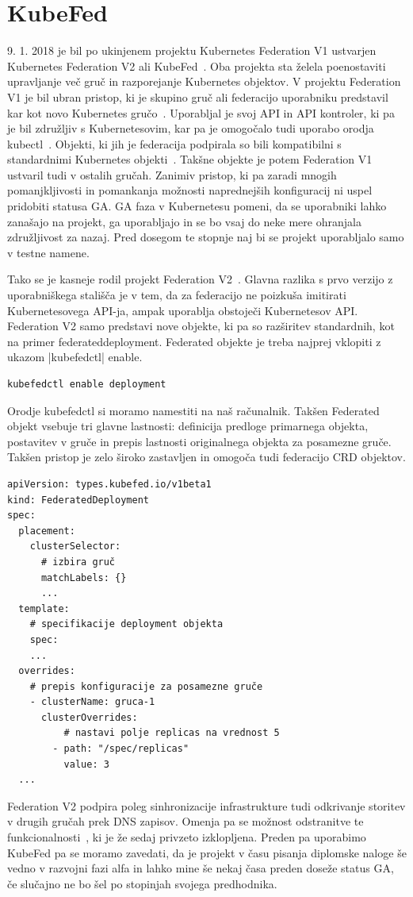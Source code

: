 \documentclass[a4paper, 12pt]{book}
\begin{document}
\section{KubeFed}
9. 1. 2018 je bil po ukinjenem projektu Kubernetes Federation V1 ustvarjen Kubernetes Federation V2 ali KubeFed~\cite{kubernetes-federation-evolution}.
Oba projekta sta želela poenostaviti upravljanje več gruč in razporejanje Kubernetes objektov.
V projektu Federation V1 je bil ubran pristop, ki je skupino gruč ali federacijo uporabniku predstavil kar kot novo Kubernetes gručo~\cite{setup-cluster-federation-kubefed-v1}.
Uporabljal je svoj API in API kontroler, ki pa je bil združljiv s Kubernetesovim, kar pa je omogočalo tudi uporabo orodja kubectl~\cite{cluster-federation-in-Kubernetes-1.5}.
Objekti, ki jih je federacija podpirala so bili kompatibilni s standardnimi Kubernetes objekti~\cite{federated-cluster-kubefed-v1}.
Takšne objekte je potem Federation V1 ustvaril tudi v ostalih gručah.
Zanimiv pristop, ki pa zaradi mnogih pomanjkljivosti in pomankanja možnosti naprednejših konfiguracij ni uspel pridobiti statusa GA.
GA faza v Kubernetesu pomeni, da se uporabniki lahko zanašajo na projekt, ga uporabljajo in se bo vsaj do neke mere ohranjala združljivost za nazaj.
  Pred dosegom te stopnje naj bi se projekt uporabljalo samo v testne namene.

Tako se je kasneje rodil projekt Federation V2~\cite{kubernetes-federation-evolution}.
Glavna razlika s prvo verzijo z uporabniškega stališča je v tem, da za federacijo ne poizkuša imitirati Kubernetesovega API-ja, ampak uporablja obstoječi Kubernetesov API. 
Federation V2 samo predstavi nove objekte, ki pa so razširitev standardnih, kot na primer federateddeployment.
Federated objekte je treba najprej vklopiti z ukazom \spverb|kubefedctl| enable.
\begin{verbatim}
kubefedctl enable deployment
\end{verbatim}
Orodje kubefedctl si moramo namestiti na naš računalnik.
Takšen Federated objekt vsebuje tri glavne lastnosti: definicija predloge primarnega objekta, postavitev v gruče in prepis lastnosti originalnega objekta za posamezne gruče.
  Takšen pristop je zelo široko zastavljen in omogoča tudi federacijo CRD objektov.
\begin{verbatim}
apiVersion: types.kubefed.io/v1beta1
kind: FederatedDeployment
spec:
  placement:
    clusterSelector:
      # izbira gruč
      matchLabels: {}
      ... 
  template:
    # specifikacije deployment objekta
    spec:
    ... 
  overrides:
    # prepis konfiguracije za posamezne gruče
    - clusterName: gruca-1
      clusterOverrides:
          # nastavi polje replicas na vrednost 5
        - path: "/spec/replicas"
          value: 3
  ... 
\end{verbatim}
Federation V2 podpira poleg sinhronizacije infrastrukture tudi odkrivanje storitev v drugih gručah prek DNS zapisov.
Omenja pa se možnost odstranitve te funkcionalnosti~\cite{remove-service-discovery}, ki je že sedaj privzeto izklopljena.
Preden pa uporabimo KubeFed pa se moramo zavedati, da je projekt v času pisanja diplomske naloge še vedno v razvojni fazi alfa in lahko mine še nekaj časa preden doseže status GA, če slučajno ne bo šel po stopinjah svojega predhodnika.
\end{document}
